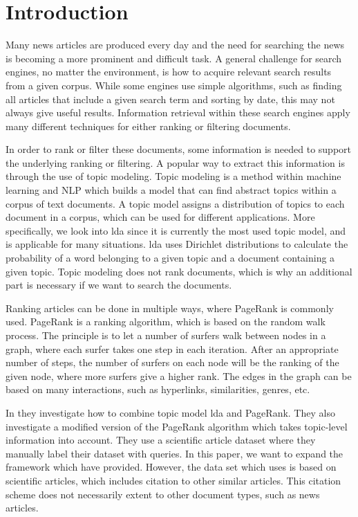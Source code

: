 \section{Introduction} 


Many news articles are produced every day and the need for searching the news is becoming a more prominent and difficult task.
A general challenge for search engines, no matter the environment, is how to acquire relevant search results from a given corpus. 
While some engines use simple algorithms, such as finding all articles that include a given search term and sorting by date, this may not always give useful results.
Information retrieval within these search engines apply many different techniques for either ranking or filtering documents\cite{google_pagerank2006}.

In order to rank or filter these documents, some information is needed to support the underlying ranking or filtering.
A popular way to extract this information is through the use of topic modeling.
Topic modeling is a method within machine learning and \gls{NLP} which builds a model that can find abstract topics within a corpus of text documents.
A topic model assigns a distribution of topics to each document in a corpus, which can be used for different applications.
More specifically, we look into \gls{lda} since it is currently the most used topic model, and is applicable for many situations\cite{lda}.
\gls{lda} uses Dirichlet distributions to calculate the probability of a word belonging to a given topic and a document containing a given topic.
Topic modeling does not rank documents, which is why an additional part is necessary if we want to search the documents.

Ranking articles can be done in multiple ways, where PageRank is commonly used\cite{google_pagerank2006}.
PageRank\cite{pagerank_1999} is a ranking algorithm, which is based on the random walk process.
The principle is to let a number of surfers walk between nodes in a graph, where each surfer takes one step in each iteration.
After an appropriate number of steps, the number of surfers on each node will be the ranking of the given node, where more surfers give a higher rank.
The edges in the graph can be based on many interactions, such as hyperlinks, similarities, genres, etc.

In \cite{yang2009topic} they investigate how to combine topic model \gls{lda} and PageRank.
They also investigate a modified version of the PageRank algorithm which takes topic-level information into account.
They use a scientific article dataset where they manually label their dataset with queries. 
In this paper, we want to expand the framework which \cite{yang2009topic} have provided.
However, the data set which \cite{yang2009topic} uses is based on scientific articles, which includes citation to other similar articles.
This citation scheme does not necessarily extent to other document types, such as news articles.

